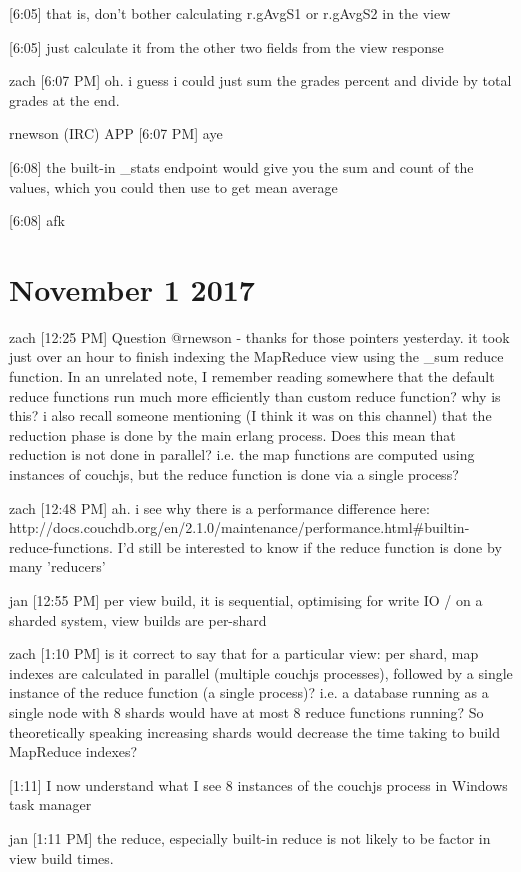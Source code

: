     [6:05]
that is, don't bother calculating r.gAvgS1 or r.gAvgS2 in the view

    [6:05]
just calculate it from the other two fields from the view response

zach [6:07 PM]
oh. i guess i could just sum the grades percent and divide by total grades at the end.

rnewson (IRC) APP [6:07 PM]
aye

    [6:08]
the built-in \_stats endpoint would give you the sum and count of the values, which you could then use to get mean average

    [6:08]
afk

\section{November 1 2017}
\label{slack-1-nov}
zach [12:25 PM]
Question @rnewson - thanks for those pointers yesterday. it took just over an hour to finish indexing the MapReduce view using the \_sum reduce function. In an unrelated note, I remember reading somewhere that the default reduce functions run much more efficiently than custom reduce function? why is this? i also recall someone mentioning (I think it was on this channel) that the reduction phase is done by the main erlang process. Does this mean that reduction is not done in parallel? i.e. the map functions are computed using instances of couchjs, but the reduce function is done via a single process?

zach [12:48 PM]
ah. i see why there is a performance difference here: http://docs.couchdb.org/en/2.1.0/maintenance/performance.html\#builtin-reduce-functions. I'd still be interested to know if the reduce function is done by many 'reducers'

jan [12:55 PM]
per view build, it is sequential, optimising for write IO / on a sharded system, view builds are per-shard

zach [1:10 PM]
is it correct to say that for a particular view: per shard, map indexes are calculated in parallel (multiple couchjs processes), followed by a single instance of the reduce function (a single process)? i.e. a database running as a single node with 8 shards would have at most 8 reduce functions running? So theoretically speaking increasing shards would decrease the time taking to build MapReduce indexes?

[1:11]
I now understand what I see 8 instances of the couchjs process in Windows task manager

jan [1:11 PM]
the reduce, especially built-in reduce is not likely to be factor in view build times.

